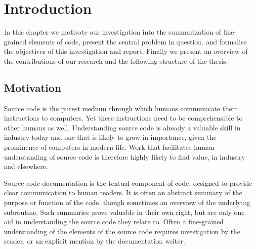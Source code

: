 \chapter{Introduction}
\label{chapterlabel1}




In this chapter we motivate our investigation into the summarization of fine-grained elements of code, present the central problem in question, and formalise the objectives of this investigation and report. 
Finally we present an overview of the contributions of our research and the following structure of the thesis.



\section{Motivation} %
\label{sec:motivation}

Source code is the purest medium through which humans communicate their instructions to computers.
Yet these instructions need to be comprehensible to other humans as well.
Understanding source code is already a valuable skill in industry today and one that is likely to grow in importance, given the prominence of computers in modern life.
Work that facilitates human understanding of source code is therefore highly likely to find value, in industry and elsewhere. %

Source code documentation is the textual component of code, designed to provide clear communication to human readers.
It is often an abstract summary of the purpose or function of the code, though sometimes an overview of the underlying subroutine.
Such summaries prove valuable in their own right, but are only one aid in understanding the source code they relate to.
Often a fine-grained understanding of the elements of the source code requires investigation by the reader, or an explicit mention by the documentation writer.

